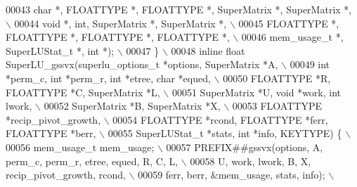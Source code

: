 \begin{DoxyCode}
00043 \textcolor{preprocessor}{                                char *, FLOATTYPE *, FLOATTYPE *, SuperMatrix *, SuperMatrix *,           \(\backslash\)}
00044 \textcolor{preprocessor}{                                void *, int, SuperMatrix *, SuperMatrix *,                                \(\backslash\)}
00045 \textcolor{preprocessor}{                                FLOATTYPE *, FLOATTYPE *, FLOATTYPE *, FLOATTYPE *,                       \(\backslash\)}
00046 \textcolor{preprocessor}{                                mem\_usage\_t *, SuperLUStat\_t *, int *);                                   \(\backslash\)}
00047 \textcolor{preprocessor}{    \}                                                                                                     \(\backslash\)}
00048 \textcolor{preprocessor}{    inline float SuperLU\_gssvx(superlu\_options\_t *options, SuperMatrix *A,                                \(\backslash\)}
00049 \textcolor{preprocessor}{         int *perm\_c, int *perm\_r, int *etree, char *equed,                                               \(\backslash\)}
00050 \textcolor{preprocessor}{         FLOATTYPE *R, FLOATTYPE *C, SuperMatrix *L,                                                      \(\backslash\)}
00051 \textcolor{preprocessor}{         SuperMatrix *U, void *work, int lwork,                                                           \(\backslash\)}
00052 \textcolor{preprocessor}{         SuperMatrix *B, SuperMatrix *X,                                                                  \(\backslash\)}
00053 \textcolor{preprocessor}{         FLOATTYPE *recip\_pivot\_growth,                                                                   \(\backslash\)}
00054 \textcolor{preprocessor}{         FLOATTYPE *rcond, FLOATTYPE *ferr, FLOATTYPE *berr,                                              \(\backslash\)}
00055 \textcolor{preprocessor}{         SuperLUStat\_t *stats, int *info, KEYTYPE) \{                                                      \(\backslash\)}
00056 \textcolor{preprocessor}{    mem\_usage\_t mem\_usage;                                                                                \(\backslash\)}
00057 \textcolor{preprocessor}{    PREFIX##gssvx(options, A, perm\_c, perm\_r, etree, equed, R, C, L,                                      \(\backslash\)}
00058 \textcolor{preprocessor}{         U, work, lwork, B, X, recip\_pivot\_growth, rcond,                                                 \(\backslash\)}
00059 \textcolor{preprocessor}{         ferr, berr, &mem\_usage, stats, info);                                                            \(\backslash\)}

\end{DoxyCode}
